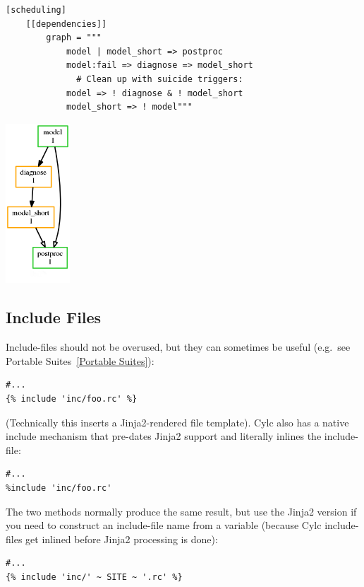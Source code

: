 \lstset{language=suiterc}
\begin{lstlisting}
[scheduling]
    [[dependencies]]
        graph = """
            model | model_short => postproc
            model:fail => diagnose => model_short
              # Clean up with suicide triggers:
            model => ! diagnose & ! model_short
            model_short => ! model"""
\end{lstlisting}
  \includegraphics[width=0.18\textwidth]{resources/png/failure-recovery.png}

\subsection{Include Files}

Include-files should not be overused, but they can sometimes be useful
(e.g.\ see Portable Suites~\ref{Portable Suites}):

\begin{lstlisting}
#...
{% include 'inc/foo.rc' %}
\end{lstlisting}

(Technically this inserts a Jinja2-rendered file template). Cylc also has a
native include mechanism that pre-dates Jinja2 support and literally inlines
the include-file:

\begin{lstlisting}
#...
%include 'inc/foo.rc'
\end{lstlisting}

The two methods normally produce the same result, but use the Jinja2 version if
you need to construct an include-file name from a variable (because Cylc
include-files get inlined before Jinja2 processing is done):

\begin{lstlisting}
#...
{% include 'inc/' ~ SITE ~ '.rc' %}
\end{lstlisting}


